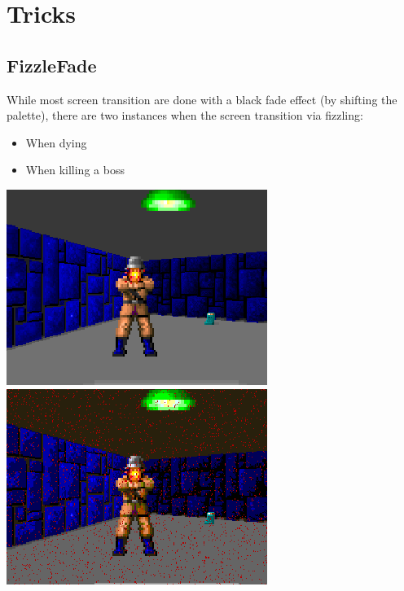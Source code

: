 \section{Tricks}






\subsection{FizzleFade}
While most screen transition are done with a black fade effect (by shifting the palette), there are two instances
when the screen transition via fizzling:
\begin{itemize}
	\item When dying
	\item When killing a boss
\end{itemize}




\begin{minipage}{\textwidth}
\centering
  \includegraphics[width=.9\textwidth]{imgs/fizzlefade/dying/screenshot_16.png}\\
  \vspace*{0.5cm}
  \includegraphics[width=.9\textwidth]{imgs/fizzlefade/dying/screenshot_19.png}\\
\end{minipage}

